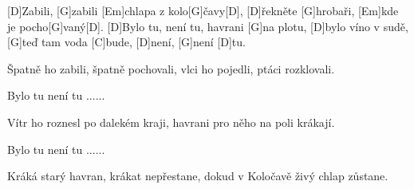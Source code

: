 
[D]Zabili, [G]zabili [Em]chlapa z kolo[G]\null čavy[D],
[D]\null řekněte [G]hrobaři, [Em]kde je pocho[G]vaný[D].
[D]Bylo tu, není tu, havrani [G]na plotu,  
[D]bylo víno v sudě, [G]teď tam voda [C]bude,  
[D]není, [G]není [D]tu.

Špatně ho zabili, špatně pochovali, 
vlci ho pojedli, ptáci rozklovali.

Bylo tu není tu ......

Vítr ho roznesl po dalekém kraji,
havrani pro něho na poli krákají.

Bylo tu není tu ......

Kráká starý havran, krákat nepřestane,
dokud v Koločavě živý chlap zůstane.

